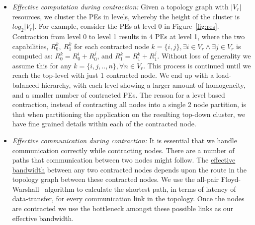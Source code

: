 \begin{itemize}

\item \textit{Effective computation during contraction:} Given a
  topology graph with $|V_r|$ resources, we cluster the PEs in levels,
  whereby the height of the cluster is $log_2|V_r|$. For example,
  consider the PEs at level 0 in Figure~\ref{fig:res}. Contraction from
  level 0 to level 1 results in 4 PEs at level 1, where the two
  capabilities, $R^k_0,\ R^k_1$ for each contracted node $k = \{i, j\},
  \exists i \in V_r \wedge \exists j \in V_r$ is computed as: $R^k_0 =
  R^i_0 + R^j_0$, and $R^k_1 = R^k_1 + R^j_1$. Without loss of
  generality we assume this for any $k = \{i,j,..,n\}, \forall n \in
  V_r$. This process is continued until we reach the top-level with just
  1 contracted node. We end up with a load-balanced hierarchy, with each
  level showing a larger amount of homogeneity, and a smaller number of
  contracted PEs. The reason for a level based contraction, instead of
  contracting all nodes into a single 2 node partition, is that when
  partitioning the application on the resulting top-down cluster, we
  have fine grained details within each of the contracted node.



\item \textit{Effective communication during contraction:} It is
  essential that we handle communication correctly while contracting
  nodes. There are a number of paths that communication between two
  nodes might follow. The \underline{effective bandwidth} between any
  two contracted nodes depends upon the route in the topology graph
  between these contracted nodes. We use the all-pair
  Floyd-Warshall~\cite{sski08} algorithm to calculate the shortest path,
  in terms of latency of data-transfer, for every communication link
  in the topology. Once the nodes are contracted we use the bottleneck
  amongst these possible links as our effective bandwidth.


\end{itemize}
